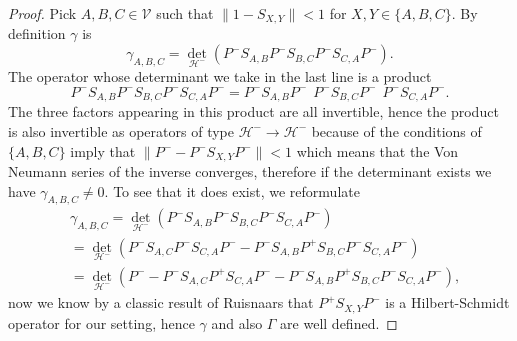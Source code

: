 \documentclass[b5paper,draft,openbib,12pt]{memoir}
\begin{document}
\begin{proof}
Pick  \(A,B,C\in\mathcal{V}\) such that \(\|1-S_{X,Y}\|<1\) for \(X,Y\in\{A,B,C\}\). 
By definition \(\gamma\) is
\begin{equation}
\gamma_{A,B,C}=\det_{\mathcal{H}^-}(P^- S_{A,B} P^- S_{B,C} P^- S_{C,A} P^-).
\end{equation}
The operator whose determinant we take in the last line is a product
\begin{equation}
P^- S_{A,B} P^- S_{B,C} P^- S_{C,A} P^-=P^- S_{A,B}P^-~~ P^- S_{B,C}P^-~~ P^- S_{C,A} P^-.
\end{equation}
The three factors appearing in this product are all invertible, hence the product is also invertible as operators of type \(\mathcal{H}^-\rightarrow \mathcal{H}^-\)
 because of the conditions of \(\{A,B,C\}\) imply that \(\|P^--P^-S_{X,Y}P^-\|<1\) which means that the Von Neumann series of the inverse converges, 
therefore if the determinant exists we have \(\gamma_{A,B,C}\neq 0\).
To see that it does exist, we reformulate
\begin{align}
&\gamma_{A,B,C}=\det_{\mathcal{H}^-}(P^- S_{A,B} P^- S_{B,C} P^- S_{C,A} P^-)\\
&=\det_{\mathcal{H}^-}(P^-S_{A,C}P^-S_{C,A}P^- - P^- S_{A,B} P^+ S_{B,C} P^- S_{C,A} P^-)\\\label{eq: gamma proof of first attri}
&=\det_{\mathcal{H}^-}(P^--P^-S_{A,C}P^+S_{C,A}P^- - P^- S_{A,B} P^+ S_{B,C} P^- S_{C,A} P^-),
\end{align}
now we know by a classic result of Ruisnaars \cite{ruisnaar&ivp0} that \(P^+S_{X,Y}P^-\) is a Hilbert-Schmidt operator for our setting,
hence \(\gamma\) and also \(\Gamma\) are well defined.


\end{proof}
\end{document}
